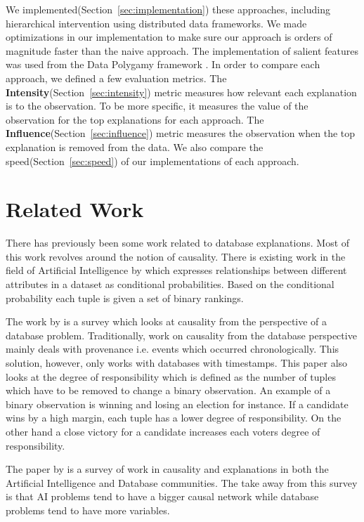 We implemented(Section~\ref{sec:implementation}) these approaches, including hierarchical intervention using distributed data frameworks\citep{borthakur2007hadoop,dean2008mapreduce,shanahan2015large,zaharia2016apache}. We made optimizations in our implementation to make sure our approach is orders of magnitude faster than the naive approach. The implementation of salient features was used from the Data Polygamy framework \citep{chirigati2016data}.
\newpage
In order to compare each approach, we defined a few evaluation metrics. The \textbf{Intensity}(Section~\ref{sec:intensity}) metric measures how relevant each explanation is to the observation. To be more specific, it measures the value of the observation for the top explanations for each approach. The \textbf{Influence}(Section~\ref{sec:influence}) metric measures the observation when the top explanation is removed from the data. We also compare the speed(Section~\ref{sec:speed}) of our implementations of each approach.

\section{Related Work}
There has previously been some work related to database explanations. Most of this work revolves around the notion of causality. There is existing work in the field of Artificial Intelligence by \cite{zhang2002discovering} which expresses relationships between different attributes in a dataset as conditional probabilities. Based on the conditional probability each tuple is given a set of binary rankings.

The work by \cite{meliou2010causality} is a survey which looks at causality from the perspective of a database problem. Traditionally, work on causality from the database perspective mainly deals with provenance i.e. events which occurred chronologically. This solution, however, only works with databases with timestamps. This paper also looks at the degree of responsibility which is defined as the number of tuples which have to be removed to change a binary observation. An example of a binary observation is winning and losing an election for instance. If a candidate wins by a high margin, each tuple has a lower degree of responsibility. On the other hand a close victory for a candidate increases each voters degree of responsibility.

The paper by \cite{meliou2014causality} is a survey of work in causality and explanations in both the Artificial Intelligence and Database communities. The take away from this survey is that AI problems tend to have a bigger causal network while database problems tend to have more variables.

